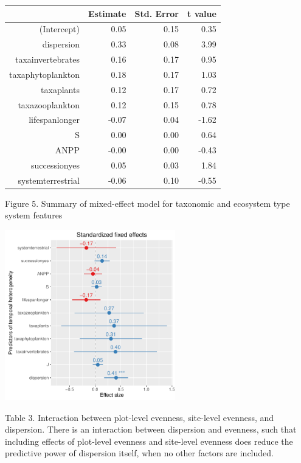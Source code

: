 \documentclass[11pt]{article}
\begin{document}
\FloatBarrier
\begin{table}[ht]
\centering
\begin{tabular}{rrrr}
  \hline
 & Estimate & Std. Error & t value \\ 
  \hline
(Intercept) & 0.05 & 0.15 & 0.35 \\ 
  dispersion & 0.33 & 0.08 & 3.99 \\ 
  taxainvertebrates & 0.16 & 0.17 & 0.95 \\ 
  taxaphytoplankton & 0.18 & 0.17 & 1.03 \\ 
  taxaplants & 0.12 & 0.17 & 0.72 \\ 
  taxazooplankton & 0.12 & 0.15 & 0.78 \\ 
  lifespanlonger & -0.07 & 0.04 & -1.62 \\ 
  S & 0.00 & 0.00 & 0.64 \\ 
  ANPP & -0.00 & 0.00 & -0.43 \\ 
  successionyes & 0.05 & 0.03 & 1.84 \\ 
  systemterrestrial & -0.06 & 0.10 & -0.55 \\ 
   \hline
\end{tabular}
\end{table}
\FloatBarrier


Figure 5. Summary of mixed-effect model for taxonomic and ecosystem type system features 

\includegraphics[width=280px]{systemmodel}


Table 3. Interaction between plot-level evenness, site-level evenness, and dispersion. There is an interaction between dispersion and evenness, such that including effects of plot-level evenness and site-level evenness does reduce the predictive power of dispersion itself, when no other factors are included. 
\end{document}
